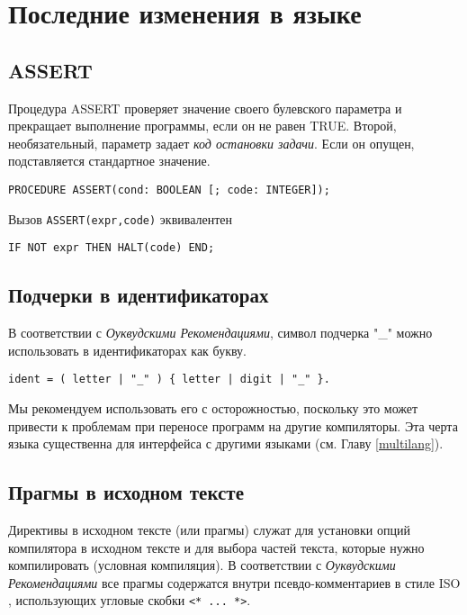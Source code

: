 \section{Последние изменения в языке}\label{o2:changes}

\subsection{ASSERT}\label{o2:ASSERT}

Процедура ASSERT проверяет значение своего булевского параметра
и прекращает выполнение программы, если он не равен
TRUE. Второй, необязательный, параметр задает
{\em код остановки задачи}. Если он опущен, подставляется стандартное
значение.

\begin{verbatim}
PROCEDURE ASSERT(cond: BOOLEAN [; code: INTEGER]);
\end{verbatim}

Вызов \verb|ASSERT(expr,code)| эквивалентен
\begin{verbatim}
IF NOT expr THEN HALT(code) END;
\end{verbatim}

\subsection{Подчерки в идентификаторах}

В соответствии с {\em Оуквудскими Рекомендациями}, символ подчерка "\_" 
можно использовать в идентификаторах как букву.
\begin{verbatim}
ident = ( letter | "_" ) { letter | digit | "_" }.
\end{verbatim}
Мы рекомендуем использовать его с осторожностью, поскольку
это может привести к проблемам при переносе программ на другие
компиляторы. Эта черта языка существенна для интерфейса с другими
языками (см. Главу \ref{multilang}).

\subsection{Прагмы в исходном тексте}\label{o2:pragmas}

Директивы в исходном тексте (или прагмы) служат для установки опций 
компилятора в исходном тексте и для выбора частей текста, которые нужно
компилировать (условная компиляция).
В соответствии с {\em Оуквудскими Рекомендациями} все прагмы содержатся
внутри псевдо-комментариев в стиле ISO \mt{}, использующих
угловые скобки \verb|<* ... *>|.


